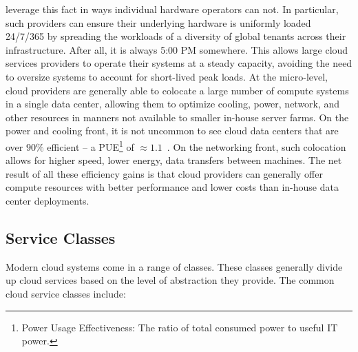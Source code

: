 \begin{packed_desc}
  leverage this fact in ways individual hardware operators can not. In
  particular, such providers can ensure their underlying hardware is
  uniformly loaded 24/7/365 by spreading the workloads of a diversity
  of global tenants across their infrastructure. After all, it is
  always 5:00 PM somewhere. This allows large cloud services providers
  to operate their systems at a steady capacity, avoiding the need to
  oversize systems to account for short-lived peak loads. At the
  micro-level, cloud providers are generally able to colocate a large
  number of compute systems in a single data center, allowing them to
  optimize cooling, power, network, and other resources in manners not
  available to smaller in-house server farms. On the power and cooling
  front, it is not uncommon to see cloud data centers that are over
  $90\%$ efficient -- a PUE\footnote{Power Usage Effectiveness: The
    ratio of total consumed power to useful IT power.} of
  $\approx1.1$~\cite{google-efficiency}. On the networking front, such
  colocation allows for higher speed, lower energy, data transfers
  between machines. The net result of all these efficiency gains is
  that cloud providers can generally offer compute resources with
  better performance and lower costs than in-house data center
  deployments.
\end{packed_desc}

\subsection{Service Classes}

Modern cloud systems come in a range of classes. These classes
generally divide up cloud services based on the level of abstraction
they provide. The common cloud service classes include:


